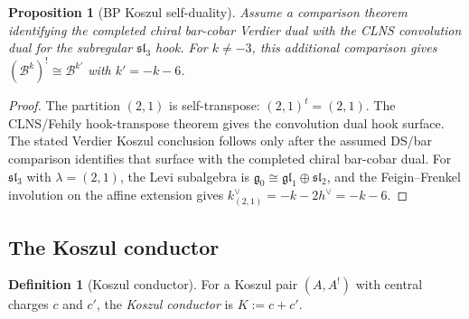 \documentclass[11pt]{article}
\theoremstyle{plain}
\newtheorem{proposition}[theorem]{Proposition}
\theoremstyle{definition}
\newtheorem{definition}[theorem]{Definition}
\theoremstyle{remark}
\newcommand{\fg}{\mathfrak{g}}
\newcommand{\fsl}{\mathfrak{sl}}
\newcommand{\cB}{\mathcal{B}}
\numberwithin{equation}{section}
\begin{document}
\begin{proposition}[BP Koszul self-duality]\label{prop:bp-self-dual}
Assume a comparison theorem identifying the completed chiral
bar-cobar Verdier dual with the CLNS convolution dual for the
subregular $\fsl_3$ hook. For $k\neq-3$, this additional comparison
gives $(\cB^k)^!\cong \cB^{k'}$ with $k'=-k-6$.
\end{proposition}

\begin{proof}
The partition $(2,1)$ is self-transpose: $(2,1)^t = (2,1)$. The
CLNS/Fehily hook-transpose theorem gives the convolution dual hook
surface. The stated Verdier Koszul conclusion follows only after the
assumed DS/bar comparison identifies that surface with the completed
chiral bar-cobar dual.
For $\fsl_3$ with $\lambda = (2,1)$, the Levi subalgebra is
$\fg_0 \cong \mathfrak{gl}_1 \oplus \fsl_2$, and the Feigin--Frenkel
involution on the affine extension gives
$k^\vee_{(2,1)} = -k - 2h^\vee = -k - 6$.
\end{proof}

\subsection{The Koszul conductor}

\begin{definition}[Koszul conductor]\label{def:koszul-conductor}
For a Koszul pair $(A, A^!)$ with central charges $c$ and $c'$, the
\emph{Koszul conductor} is $K := c + c'$.
\end{definition}
\end{document}

